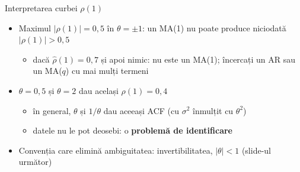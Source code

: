 \begin{frame}{Interpretarea curbei $\rho(1)$}
\itemsize{\small}
\begin{itemize}
    \item Maximul $|\rho(1)| = 0{,}5$ în $\theta = \pm 1$: un MA(1) nu poate produce niciodată $|\rho(1)| > 0{,}5$
    \begin{itemize}
        \item dacă $\hat\rho(1) = 0{,}7$ și apoi nimic: nu este un MA(1); încercați un AR sau un MA($q$) cu mai mulți termeni
    \end{itemize}
    \item $\theta = 0{,}5$ și $\theta = 2$ dau același $\rho(1) = 0{,}4$
    \begin{itemize}
        \item în general, $\theta$ și $1/\theta$ dau aceeași ACF (cu $\sigma^2$ înmulțit cu $\theta^2$)
        \item datele nu le pot deosebi: o \textbf{problemă de identificare}
    \end{itemize}
    \item Convenția care elimină ambiguitatea: invertibilitatea, $|\theta| < 1$ (slide-ul următor)
\end{itemize}
\end{frame}

